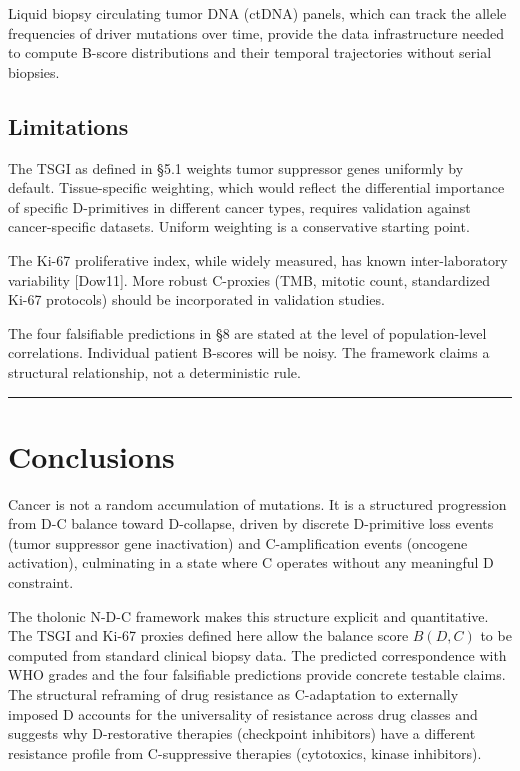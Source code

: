 \documentclass[12pt]{article}
\begin{document}
Liquid biopsy circulating tumor DNA (ctDNA) panels, which can track the
allele frequencies of driver mutations over time, provide the data
infrastructure needed to compute B-score distributions and their
temporal trajectories without serial biopsies.

\subsection{Limitations}\label{limitations}

The TSGI as defined in §5.1 weights tumor suppressor genes uniformly by
default. Tissue-specific weighting, which would reflect the differential
importance of specific D-primitives in different cancer types, requires
validation against cancer-specific datasets. Uniform weighting is a
conservative starting point.

The Ki-67 proliferative index, while widely measured, has known
inter-laboratory variability {[}Dow11{]}. More robust C-proxies (TMB,
mitotic count, standardized Ki-67 protocols) should be incorporated in
validation studies.

The four falsifiable predictions in §8 are stated at the level of
population-level correlations. Individual patient B-scores will be
noisy. The framework claims a structural relationship, not a
deterministic rule.

\begin{center}\rule{0.5\linewidth}{0.5pt}\end{center}

\section{Conclusions}\label{conclusions}

Cancer is not a random accumulation of mutations. It is a structured
progression from D-C balance toward D-collapse, driven by discrete
D-primitive loss events (tumor suppressor gene inactivation) and
C-amplification events (oncogene activation), culminating in a state
where C operates without any meaningful D constraint.

The tholonic N-D-C framework makes this structure explicit and
quantitative. The TSGI and Ki-67 proxies defined here allow the balance
score \(B(D,C)\) to be computed from standard clinical biopsy data. The
predicted correspondence with WHO grades and the four falsifiable
predictions provide concrete testable claims. The structural reframing
of drug resistance as C-adaptation to externally imposed D accounts for
the universality of resistance across drug classes and suggests why
D-restorative therapies (checkpoint inhibitors) have a different
resistance profile from C-suppressive therapies (cytotoxics, kinase
inhibitors).
\end{document}
